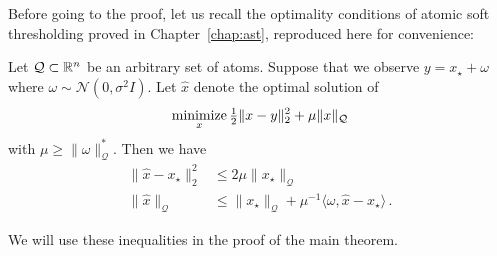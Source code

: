 Before going to the proof, let us recall the optimality conditions of atomic
soft thresholding proved in Chapter~\ref{chap:ast}, reproduced here for
convenience:
\begin{theorem}\label{thm:badri}
Let $\mathcal{Q}\subset \mathbb{R}^n$ be an arbitrary set of atoms.  Suppose that we observe $y = x_\star+\omega$ where $\omega\sim \mathcal{N}(0,\sigma^2 I)$.  Let $\hat{x}$ denote the optimal solution of
\[
	\mathop{\operatorname{minimize}}_x \tfrac{1}{2}\|x-y\|_2^2 + \mu \|x\|_\mathcal{Q}
\]
with  $\mu \geq\|\omega\|_{\mathcal{Q}}^*$.  Then we have
\begin{align}
	 \|\hat{x}-x_\star\|_2^2 &\leq 2 \mu \|x_\star\|_{\mathcal{Q}}\\
	 \|\hat{x}\|_{\mathcal{Q}} &\leq \|x_\star\|_{\mathcal{Q}} + \mu^{-1} \langle \omega, \hat{x}-x_\star\rangle\,.
\end{align}
\end{theorem}
We will use these inequalities in the proof of the main theorem.

